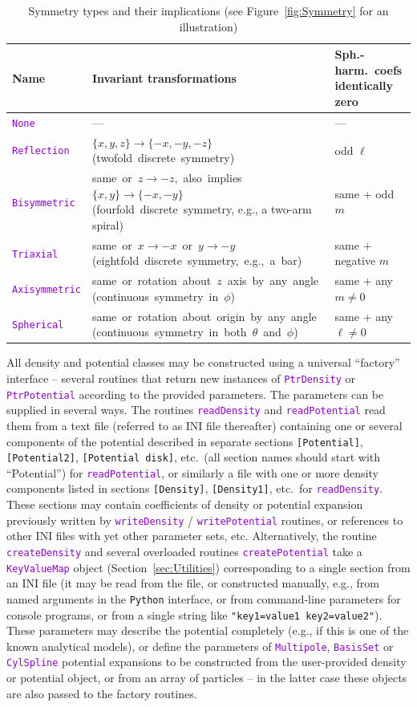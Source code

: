 \documentclass[12pt]{article}
\newcommand{\Python}{\texttt{Python}\xspace}
\newcommand{\ttt}[1]{\textcolor{darkviolet}{\texttt{#1}}}
\newcommand{\ppp}[1]{\textcolor{darkolive} {\texttt{#1}}}
\begin{document}
\begin{table}
\caption{Symmetry types and their implications (see Figure~\ref{fig:Symmetry} for an illustration)}  \label{tab:Symmetry}
\renewcommand{\arraystretch}{1.2}
\begin{tabular}{l m{9.2cm} m{3.5cm}}
Name & Invariant transformations & \mbox{Sph.-harm.~coefs} identically zero \\
\hline
\ttt{None} & --- & --- \\
\ttt{Reflection} & \mbox{$\{x,y,z\} \to \{-x,-y,-z\}$} \mbox{(twofold discrete symmetry)} & odd $\ell$ \\
\ttt{Bisymmetric} & \mbox{same or $z \to -z$, also implies $\{x,y\} \to \{-x,-y\}$} \mbox{(fourfold discrete symmetry}, e.g., a two-arm spiral) & same + odd $m$ \\
\ttt{Triaxial} & \mbox{same or $x \to -x$ or $y \to -y$} \mbox{(eightfold discrete symmetry, e.g., a bar)} & same + negative $m$ \\
\ttt{Axisymmetric} & \mbox{same or rotation about $z$ axis by any angle} \mbox{(continuous symmetry in $\phi$)} & same + any $m \ne 0$ \\
\ttt{Spherical} & \mbox{same or rotation about origin by any angle} \mbox{(continuous symmetry in both $\theta$ and $\phi$)} & same + any $\ell \ne 0$
\end{tabular}
\end{table}

All density and potential classes may be constructed using a universal ``factory'' interface -- several routines that return new instances of \ttt{PtrDensity} or \ttt{PtrPotential} according to the provided parameters.
The parameters can be supplied in several ways. The routines \ttt{readDensity} and \ttt{readPotential} read them from a text file (referred to as INI file thereafter) containing one or several components of the potential described in separate sections \ppp{[Potential]}, \ppp{[Potential2]}, \ppp{[Potential disk]}, etc.\ (all section names should start with ``Potential'') for \ttt{readPotential}, or similarly a file with one or more density components listed in sections \ppp{[Density]}, \ppp{[Density1]}, etc.\ for \ttt{readDensity}. These sections may contain coefficients of density or potential expansion previously written by \ttt{writeDensity} / \ttt{writePotential} routines, or references to other INI files with yet other parameter sets, etc.
Alternatively, the routine \ttt{createDensity} and several overloaded routines \ttt{createPotential} take a \ttt{KeyValueMap} object (Section~\ref{sec:Utilities}) corresponding to a single section from an INI file (it may be read  from the file, or constructed manually, e.g., from named arguments in the \Python interface, or from command-line parameters for console programs, or from a single string like \ppp{"key1=value1 key2=value2"}). These parameters may describe the potential completely (e.g., if this is one of the known analytical models), or define the parameters of \ttt{Multipole}, \ttt{BasisSet} or \ttt{CylSpline} potential expansions to be constructed from the user-provided density or potential object, or from an array of particles -- in the latter case these objects are also passed to the factory routines. 
\end{document}
